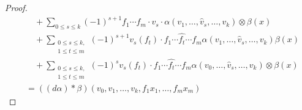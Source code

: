 \documentclass[12pt]{amsart}
\theoremstyle{definition}
\begin{document}
\begin{proof}
\begin{align*}
&\quad+ \sum_{0 \leq s \leq k} (-1)^{s+1}  f_1 \cdots f_m \cdot v_s \cdot \alpha(v_1, \dots, \hat{v}_s, \dots, v_k)  \otimes \beta(x) \\
& \quad+ \sum_{\substack{0 \leq s \leq k, \\ 1 \leq t\leq m}} (-1)^{s+1} v_s(f_t) \cdot f_1 \cdots \hat{f_t} \cdots f_m \alpha(v_1, \dots, \hat{v}_s, \dots, v_k)  \beta(x) \\
& \quad+\sum_{\substack{0 \leq s \leq k, \\ 1 \leq t\leq m}}(-1)^{s} v_s(f_t) \cdot f_1 \cdots \hat{f_t} \cdots f_m \alpha(v_0, \dots, \hat{v}_s, \dots, v_k) \otimes \beta (x) \\
& =   ((d\alpha)\ast \beta) (v_0, v_1, \dots, v_k, f_1  x_1, \dots, f_m  x_m) 
\end{align*}


\end{proof}
\end{document}
